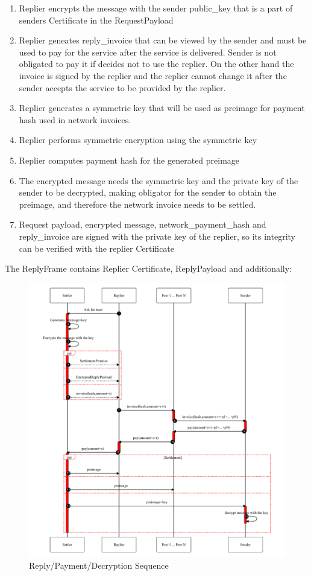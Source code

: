 \documentclass{article}
\begin{document}
\begin{enumerate}
	\item Replier encrypts the message with the sender public\_key that is a part of senders Certificate in the RequestPayload
	\item Replier geneates reply\_invoice that can be viewed by the sender and must be used to pay for the service after the service is delivered. Sender is not obligated to pay it if decides not to use the replier. On the other hand the invoice is signed by the replier and the replier cannot change it after the sender accepts the service to be provided by the replier.
	\item Replier generates a symmetric key that will be used as preimage for payment hash used in network invoices.
	\item Replier performs symmetric encryption using the symmetric key
	\item Replier computes payment hash for the generated preimage
	\item The encrypted message needs the symmetric key and the private key of the sender to be decrypted, making obligator for the sender to obtain the preimage, and therefore the network invoice needs to be settled.
	\item Request payload, encrypted message, network\_payment\_hash and reply\_invoice are signed with the private key of the replier, so its integrity can be verified with the replier Certificate
\end{enumerate}

The ReplyFrame contains Replier Certificate, ReplyPayload and additionally:

\begin{figure}
	\centering
	\includegraphics[scale=0.8]{ReplyAndPay.pdf}
	\caption{Reply/Payment/Decryption Sequence}
	\label{fig:replyandpay}
\end{figure}
\end{document}
